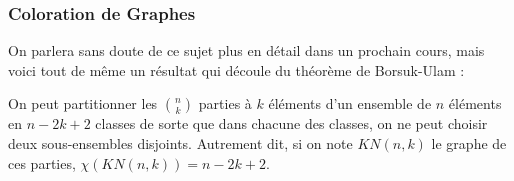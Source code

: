 \documentclass{beamercours}
\begin{document}
\begin{frame}
    \frametitle{Coloration de Graphes}
    On parlera sans doute de ce sujet plus en détail dans un prochain cours, mais voici tout de même un résultat qui découle du théorème de Borsuk-Ulam : \\
    \begin{theorem}
        On peut partitionner les $\binom{n}{k}$ parties à $k$ éléments d'un ensemble de $n$ éléments en $n - 2k + 2$ classes de sorte que dans chacune des classes, on ne peut choisir deux sous-ensembles disjoints. Autrement dit, si on note $KN(n, k)$ le graphe de ces parties, $\chi\left(KN(n, k)\right) = n - 2k + 2$.
    \end{theorem}

\end{frame}
\end{document}
